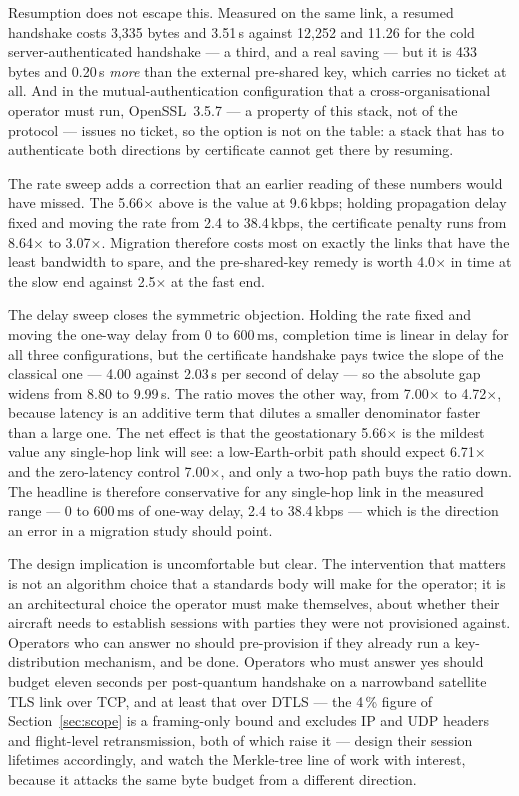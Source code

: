 \documentclass[drones,article,submit,pdftex,moreauthors]{Definitions/mdpi}
\newcommand{\kbps}{kbps}
\newcommand{\tls}{TLS}
\begin{document}
Resumption does not escape this. Measured on the same link, a resumed
handshake costs 3{,}335 bytes and 3.51\,s against 12{,}252 and 11.26 for
the cold server-authenticated handshake --- a third, and a real saving
--- but it is 433 bytes and 0.20\,s \emph{more} than the external
pre-shared key, which carries no ticket at all. And in the
mutual-authentication configuration that a cross-organisational operator
must run, OpenSSL~3.5.7 --- a property of this stack, not of the
protocol --- issues no ticket, so the option is not on the
table: a stack that has to authenticate both directions by certificate
cannot get there by resuming.

The rate sweep adds a correction that an earlier reading of these
numbers would have missed. The 5.66$\times$ above is the value at
9.6\,\kbps{}; holding propagation delay fixed and moving the rate from
2.4 to 38.4\,\kbps{}, the certificate penalty runs from 8.64$\times$
to 3.07$\times$. Migration therefore costs most on exactly the links
that have the least bandwidth to spare, and the pre-shared-key remedy
is worth 4.0$\times$ in time at the slow end against 2.5$\times$ at
the fast end.

The delay sweep closes the symmetric objection. Holding the rate fixed
and moving the one-way delay from 0 to 600\,ms, completion time is
linear in delay for all three configurations, but the certificate
handshake pays twice the slope of the classical one --- 4.00 against
2.03\,s per second of delay --- so the absolute gap widens from 8.80 to
9.99\,s. The ratio moves the other way, from 7.00$\times$ to
4.72$\times$, because latency is an additive term that dilutes a
smaller denominator faster than a large one. The net effect is that the
geostationary 5.66$\times$ is the mildest value any single-hop link
will see: a low-Earth-orbit path should expect 6.71$\times$ and the
zero-latency control 7.00$\times$, and only a two-hop path buys the
ratio down. The headline is therefore conservative for any single-hop
link in the measured range --- 0 to 600\,ms of one-way delay, 2.4 to
38.4\,\kbps{} --- which is the direction an error in a
migration study should point.

The design implication is uncomfortable but clear. The intervention
that matters is not an algorithm choice that a standards body will make
for the operator; it is an architectural choice the operator must make
themselves, about whether their aircraft needs to establish sessions
with parties they were not provisioned against. Operators who can answer
no should pre-provision if they already run a key-distribution
mechanism, and be done. Operators who must answer yes
should budget eleven seconds per post-quantum handshake on a narrowband
satellite \tls{} link over TCP, and at least that over DTLS --- the
4\,\% figure of Section~\ref{sec:scope} is a framing-only bound and
excludes IP and UDP headers and flight-level retransmission, both of
which raise it --- design
their session lifetimes accordingly, and watch
the Merkle-tree line of work with interest, because it attacks the same
byte budget from a different direction.
\end{document}
